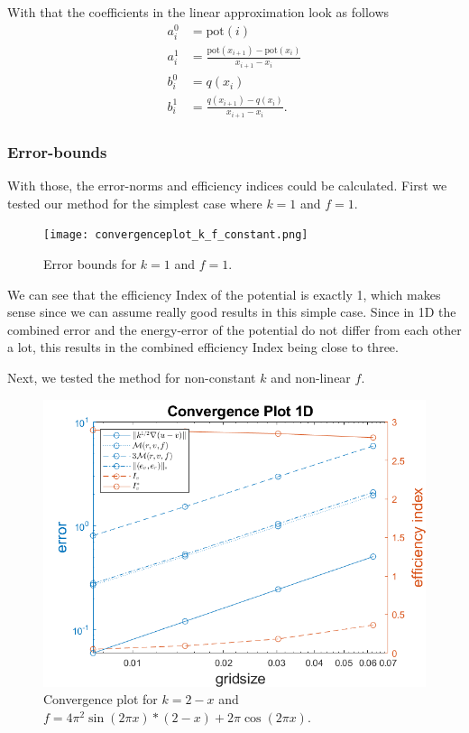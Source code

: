 \documentclass{article}
\begin{document}
	With that the coefficients in the linear approximation look as follows
	\begin{align*}
	a_i^0 &= \mathrm{pot}(i)\\
	a_i^1 &= \frac{\mathrm{pot}(x_{i+1}) - \mathrm{pot}(x_i)}{x_{i+1} - x_i}\\
	b_i^0 &= q(x_i)\\
	b_i^1 &= \frac{q(x_{i+1}) - q(x_i)}{x_{i+1} - x_i}.
	\end{align*}
	
	\subsubsection*{Error-bounds}
	With those, the error-norms and efficiency indices could be calculated.
	First we tested our method for the simplest case where $k=1$ and $f=1$.
	
	\begin{figure}
		\centering
		\texttt{[image: convergenceplot\_k\_f\_constant.png]}
		\caption{Error bounds for $k=1$ and $f=1$.}
		\label{fig:kfconst}
	\end{figure}
	
	We can see that the efficiency Index of the potential is exactly 1, which makes sense since we can assume really good results in this simple case.
	Since in 1D the combined error and the energy-error of the potential do not differ from each other a lot, this results in the combined efficiency Index being close to three.
	
	Next, we tested the method for non-constant $k$ and non-linear $f$.
	
	\begin{figure}
		\centering
		\includegraphics[width = 0.8\linewidth]{convergenceplot_k_f_non_constant.png}
		\caption{Convergence plot for $k=2-x$ and $f = 4\pi^2 \sin(2\pi x)*(2-x) + 2\pi \cos(2\pi x)$.}
		\label{fig:fknconst}
	\end{figure}
	
\end{document}
